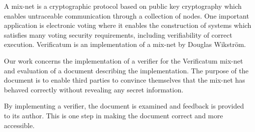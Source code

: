 A mix-net is a cryptographic protocol based on public key cryptography
which enables untraceable communication through a collection of
nodes. One important application is electronic voting where it enables
the construction of systems which satisfies many voting security
requirements, including verifiability of correct
execution. Verificatum is an implementation of a mix-net by Douglas
Wikström.

Our work concerns the implementation of a verifier for the Verificatum
mix-net and evaluation of a document describing the
implementation. The purpose of the document is to enable third parties
to convince themselves that the mix-net has behaved correctly without
revealing any secret information. 

By implementing a verifier, the document is examined and feedback is
provided to its author. This is one step in making the document
correct and more accessible.
